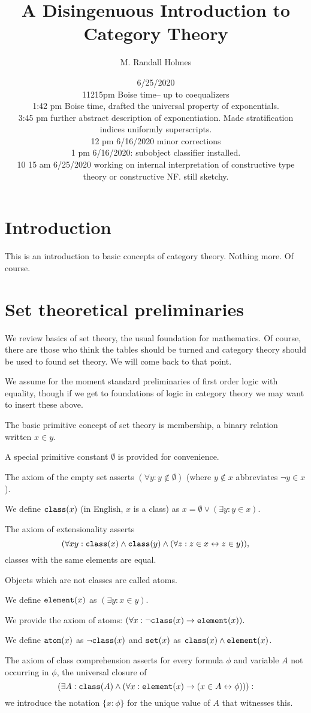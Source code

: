 \documentclass[12pt]{article}
\title{A Disingenuous Introduction to Category Theory}
\author{M. Randall Holmes}
\date{6/25/2020 \\ 11215pm Boise time-- up to coequalizers \\ 1:42 pm Boise time, drafted the universal property of exponentials. \\ 3:45 pm further abstract description of exponentiation.  Made stratification indices uniformly superscripts.\\ 12 pm 6/16/2020 minor corrections \\ 1 pm 6/16/2020:  subobject classifier installed.\\ 10 15 am 6/25/2020 working on internal interpretation of constructive type theory or  constructive NF.  still sketchy.}
\begin{document}
\maketitle

\section{Introduction}

This is an introduction to basic concepts of category theory.  Nothing more.  Of course.

\section{Set theoretical preliminaries}

We review basics of set theory, the usual foundation for mathematics.  Of course, there are those who think the tables should be turned and category theory should be used to found set theory.  We will come back to that point.

We assume for the moment standard preliminaries of first order logic with equality, though if we get to foundations of logic in category theory we may want to insert these above.

The basic primitive concept of set theory is membership, a binary relation written $x \in y$.

A special primitive constant $\emptyset$ is provided for convenience.  

The axiom of the empty set asserts $(\forall y: y \not\in \emptyset)$ (where $y \not\in x$ abbreviates $\neg y \in x$).

We define ${\tt class}(x)$ (in English, $x$ is a class) as $x = \emptyset \vee (\exists y: y \in x)$.

The axiom of extensionality asserts $$(\forall xy: {\tt class}(x) \wedge {\tt class}(y)  \wedge (\forall z:z \in x \leftrightarrow z \in y)),$$ classes with the same elements are equal.

Objects which are not classes are called atoms.

We define ${\tt element}(x)$ as $(\exists y:x \in y)$. 

We provide the axiom of atoms:  $(\forall x:\neg{\tt class}(x) \rightarrow {\tt element}(x)).$

We define ${\tt atom}(x)$ as $\neg{\tt class}(x)$ and ${\tt set}(x)$ as ${\tt class}(x) \wedge {\tt element}(x)$.

The axiom of class comprehension asserts for every formula $\phi$ and variable $A$ not occurring in $\phi$, the universal closure of $$(\exists A: {\tt class}(A) \wedge  (\forall x: {\tt element}(x) \rightarrow (x \in A \leftrightarrow \phi))):$$  we introduce the notation $\{x : \phi\}$ for the unique value of $A$ that witnesses this.
\end{document}
